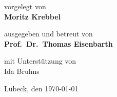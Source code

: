 \begin{titlepage}
{%
\vspace*{1.5em}

vorgelegt von \\ %
\textbf{Moritz Krebbel}

\vspace*{1.5em}

ausgegeben und betreut von \\ %
\textbf{Prof.\ Dr.\ Thomas Eisenbarth}

\vspace*{1.5em}

mit Unterstützung von \\ %
Ida Bruhns

\vspace*{2em}

\vfill

Lübeck, den \today
}
\end{titlepage}
